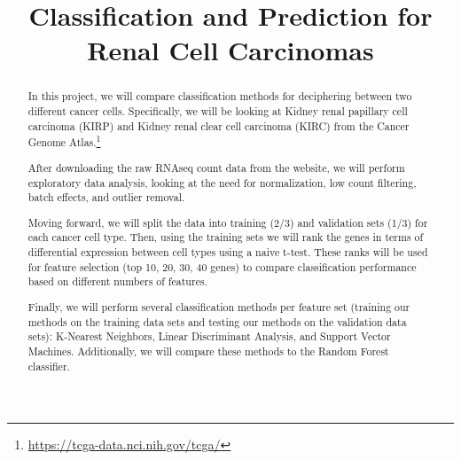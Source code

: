 

\usepackage{fullpage}



\begin{frontmatter}

\title{Classification and Prediction for Renal Cell Carcinomas}




\begin{abstract}

In this project, we will compare classification methods for deciphering between
two different cancer cells. Specifically, we will be looking at Kidney renal
papillary cell carcinoma (KIRP) and Kidney renal clear cell carcinoma (KIRC)
from the Cancer Genome
Atlas.\footnote{\url{https://tcga-data.nci.nih.gov/tcga/}}

After downloading the raw RNAseq count data from the website, we will perform
exploratory data analysis, looking at the need for normalization, low count
filtering, batch effects, and outlier removal.

Moving forward, we will split the data into training (2/3) and validation sets
(1/3) for each cancer cell type. Then, using the training sets we will rank the
genes in terms of differential expression between cell types using a naive
t-test. These ranks will be used for feature selection (top 10, 20, 30, 40
genes) to compare classification performance based on different numbers of
features.

Finally, we will perform several classification methods per feature set
(training our methods on the training data sets and testing our methods on the
validation data sets): K-Nearest Neighbors, Linear Discriminant Analysis, and
Support Vector Machines.  Additionally, we will compare these methods to the
Random Forest classifier.

 
\end{abstract}

\begin{keyword}
\end{keyword}

\end{frontmatter}

